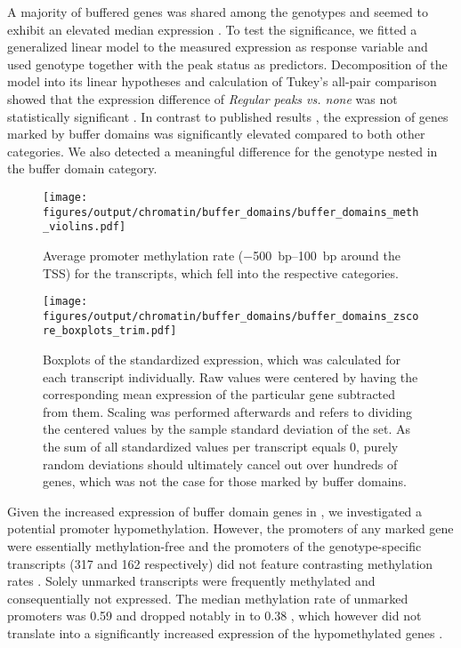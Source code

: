 A majority of buffered genes was shared among the genotypes  and seemed to exhibit an elevated median expression . To test the significance, we fitted a generalized linear model to the measured expression as response variable and used genotype together with the peak status as predictors. Decomposition of the model into its linear hypotheses and calculation of Tukey's all-pair comparison showed that the expression difference of \emph{Regular \hisfourthree peaks vs. none} was not statistically significant . In contrast to published results \cite{Benayoun2014}, the expression of genes marked by \hisfourthree buffer domains was significantly elevated compared to both other categories. We also detected a meaningful difference for the genotype nested in the \hisfourthree buffer domain category.

\begin{figure}[!ht]
	\texttt{[image: figures/output/chromatin/buffer\_domains/buffer\_domains\_meth\_violins.pdf]} 
	\caption{Average promoter methylation rate (\SIrange{-500}{+100}{bp} around the TSS) for the transcripts, which fell into the respective \hisfourthree categories.}
	\label{fig:genes:buffer_domains_meth_violins}
\end{figure}

\begin{figure}[!ht]
	\centering
	\texttt{[image: figures/output/chromatin/buffer\_domains/buffer\_domains\_zscore\_boxplots\_trim.pdf]} 
	\caption{Boxplots of the standardized expression, which was calculated for each transcript individually. Raw values were centered by having the corresponding mean expression of the particular gene subtracted from them. Scaling was performed afterwards and refers to dividing the centered values by the sample standard deviation of the set. As the sum of all standardized values per transcript equals \num{0}, purely random deviations should ultimately cancel out over hundreds of genes, which was not the case for those marked by buffer domains.} 
	\label{fig:genes:buffer_domains_zscore_boxplots}
\end{figure}

Given the increased expression of buffer domain genes in \dnmtchip, we investigated a potential promoter hypomethylation. However, the promoters of any \hisfourthree marked gene were essentially methylation-free  and the promoters of the genotype-specific transcripts (\num{317} and \num{162} respectively)  did not feature contrasting methylation rates \dns. Solely unmarked transcripts were frequently methylated and consequentially not expressed. The median methylation rate of unmarked promoters was \num{0.59} and dropped notably in \dnmtchip to \num{0.38} , which however did not translate into a significantly increased expression of the hypomethylated genes . 

 






